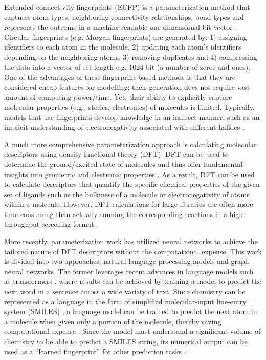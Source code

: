 Extended-connectivity fingerprints (ECFP) is a parameterization method that captures atom types, neighboring connectivity relationships, bond types and represents the outcome in a machine-readable one-dimensional bit-vector \cite{Rogers2010}. Circular fingerprints (e.g. Morgan fingerprints) are generated by: 1) assigning identifiers to each atom in the molecule, 2) updating each atom’s identifiers depending on the neighboring atoms, 3) removing duplicates and 4) compressing the data into a vector of set length e.g. 1024 bit (a number of zeros and ones). One of the advantages of these fingerprint based methods is that they are considered cheap features for modelling; their generation does not require vast amount of computing power/time. Yet, their ability to explicitly capture molecular properties (e.g., sterics, electronics) of molecules is limited. Typically, models that use fingerprints develop knowledge in an indirect manner, such as an implicit understanding of electronegativity associated with different halides \cite{Eyke2020}.

A much more comprehensive parameterization approach is calculating molecular descriptors using density functional theory (DFT). DFT can be used to determine the ground/excited state of molecules and thus offer fundamental insights into geometric and electronic properties \cite{Shields2021}. As a result, DFT can be used to calculate descriptors that quantify the specific chemical properties of the given set of ligands such as the bulkiness of a molecule or electronegativity of atoms within a molecule. However, DFT calculations for large libraries are often more time-consuming than actually running the corresponding reactions in a high-throughput screening format.

More recently, parameterization work has utilized neural networks to achieve the tailored nature of DFT descriptors without the computational expense. This work is divided into two approaches: natural language processing models and graph neural networks. The former leverages recent advances in language models such as transformers \cite{Vaswani2017}, where results can be achieved by training a model to predict the next word in a sentence across a wide variety of text. Since chemistry can be represented as a language in the form of simplified molecular-input line-entry system (SMILES) \cite{Weininger1988}, a language model can be trained to predict the next atom in a molecule when given only a portion of the molecule, thereby saving computational expense \cite{Schwaller2019}. Since the model must understand a significant volume of chemistry to be able to predict a SMILES string, its numerical output can be used as a “learned fingerprint” for other prediction tasks \cite{Schwaller2021}.


